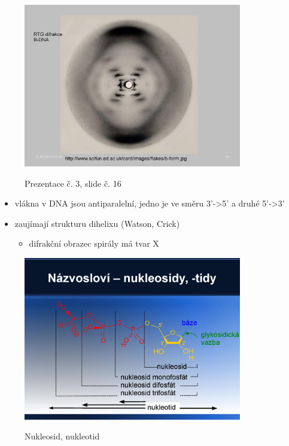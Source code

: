 \documentclass[DIV=8]{scrreprt}
\begin{document}
\begin{figure}
    \caption{Prezentace č. 3, slide č. 16}
    \includegraphics[width=0.85\textwidth]{slides-3/slide-16.jpg}
    \centering
    \label{slides-3-slide-16}
\end{figure}

\begin{itemize}[nosep]
    \item vlákna v DNA jsou antiparalelní, jedno je ve směru 3'->5' a druhé 5'->3'
    \item zaujímají strukturu dihelixu (Watson, Crick)
\begin{itemize}[nosep]
    \item difrakční obrazec spirály má tvar X
\end{itemize}

\end{itemize}



\begin{figure}
    \caption{Nukleosid, nukleotid}
    \includegraphics[width=0.85\textwidth]{slides-3/slide-21.jpg}
    \centering
    \label{}
\end{figure}
\end{document}
